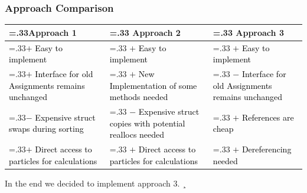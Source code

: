 \begin{frame}
	\frametitle{Approach Comparison}
	\large
	\setlength\tabcolsep{0.5cm}
	\def\arraystretch{1.5}
	\begin{tabularx}{\linewidth}{>{\hsize=.33\hsize}X|>{\hsize=.33\hsize}X|>{\hsize=.33\hsize}X}		
		
		Approach 1 & Approach 2 & Approach 3 \\
		\hline
		\textcolor{black}{$+$ Easy to implement} & 
		\textcolor{black}{$+$ Easy to implement} &
		\textcolor{black}{$+$ Easy to implement} \\ 
		
		
		
		\textcolor{black}{$+$ Interface for old Assignments remains unchanged} & 
		\textcolor{black}{$+$ New Implementation of some methods needed} &
		\textcolor{black}{$-$ Interface for old Assignments remains unchanged} \\
		
		\textcolor{black}{$-$ Expensive struct swaps during sorting} & 
		\textcolor{black}{$-$ Expensive struct copies with potential reallocs needed} &
		\textcolor{black}{$+$ References are cheap} \\
		
		\textcolor{black}{$+$ Direct access to particles for calculations} & 
		\textcolor{black}{$+$ Direct access to particles for calculations}&
		\textcolor{black}{$+$ Dereferencing needed} \\		
	\end{tabularx}

	\pause
	\vspace{0.4cm}
	In the end we decided to implement approach 3.
¸\end{frame}

